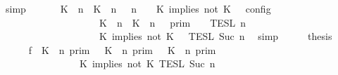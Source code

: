 \begin{isabellebody}
\ simp\isanewline
\ \ \isamarkupfalse%
\ \isamarkupfalse%
\ {\isacartoucheopen}{\isasymlbrakk}\ {\isacharparenleft}{\isacharparenleft}K\ {\isasymUp}\ n{\isacharparenright}\ {\isacharhash}\ {\isacharparenleft}K\ {\isasymnot}{\isasymUp}\ n{\isacharparenright}\ {\isacharhash}\ {\isasymGamma}{\isacharparenright}{\isacharcomma}\ n\ {\isasymturnstile}\ {\isasymPsi}\ {\isasymtriangleright}\ {\isacharparenleft}{\isacharparenleft}K\ implies\ not\ K\ {\isacharhash}\ {\isasymPhi}{\isacharparenright}\ {\isasymrbrakk}\isactrlsub c\isactrlsub o\isactrlsub n\isactrlsub f\isactrlsub i\isactrlsub g\isanewline
\ \ \ \ \ \ \ \ \ \ \ \ \ \ \ \ \ \ {\isacharequal}\ {\isasymlbrakk}{\isasymlbrakk}\ {\isacharparenleft}{\isacharparenleft}K\ {\isasymUp}\ n{\isacharparenright}\ {\isacharhash}\ {\isacharparenleft}K\ {\isasymnot}{\isasymUp}\ n{\isacharparenright}\ {\isacharhash}\ {\isasymGamma}{\isacharparenright}\ {\isasymrbrakk}{\isasymrbrakk}\isactrlsub p\isactrlsub r\isactrlsub i\isactrlsub m\ {\isasyminter}\ {\isasymlbrakk}{\isasymlbrakk}\ {\isasymPsi}\ {\isasymrbrakk}{\isasymrbrakk}\isactrlsub T\isactrlsub E\isactrlsub S\isactrlsub L\isactrlbsup {\isasymge}\ n\isactrlesup \isanewline
\ \ \ \ \ \ \ \ \ \ \ \ \ \ \ \ \ \ {\isasyminter}\ {\isasymlbrakk}{\isasymlbrakk}\ {\isacharparenleft}K\ implies\ not\ K\ {\isacharhash}\ {\isasymPhi}\ {\isasymrbrakk}{\isasymrbrakk}\isactrlsub T\isactrlsub E\isactrlsub S\isactrlsub L\isactrlbsup {\isasymge}\ Suc\ n\isactrlesup {\isacartoucheclose}\ \isamarkupfalse%
\ simp\isanewline
\ \ \isamarkupfalse%
\ \isamarkupfalse%
\ {\isacharquery}thesis\isanewline
\ \ \isamarkupfalse%
\ {\isacharminus}\isanewline
\ \ \ \ \isamarkupfalse%
\ f{}{\isacharcolon}\ {\isacartoucheopen}{\isacharparenleft}{\isasymlbrakk}\ K\ {\isasymnot}{\isasymUp}\ n\ {\isasymrbrakk}\isactrlsub p\isactrlsub r\isactrlsub i\isactrlsub m\ {\isasymunion}\ {\isasymlbrakk}\ K\ {\isasymUp}\ n\ {\isasymrbrakk}\isactrlsub p\isactrlsub r\isactrlsub i\isactrlsub m\ {\isasyminter}\ {\isasymlbrakk}\ K\ {\isasymnot}{\isasymUp}\ n\ {\isasymrbrakk}\isactrlsub p\isactrlsub r\isactrlsub i\isactrlsub m{\isacharparenright}\isanewline
\ \ \ \ \ \ \ \ \ \ \ \ \ \ {\isasyminter}\ {\isasymlbrakk}\ K\ implies\ not\ K\ {\isasymrbrakk}\isactrlsub T\isactrlsub E\isactrlsub S\isactrlsub L\isactrlbsup {\isasymge}\ Suc\ n\isactrlesup \isanewline

\end{isabellebody}
